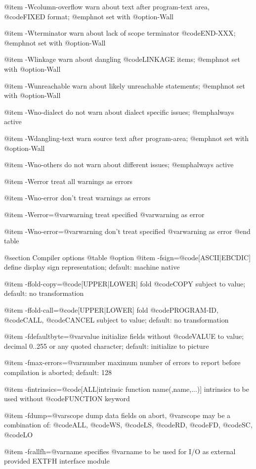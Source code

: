@item -Wcolumn-overflow
warn about text after program-text area, @code{FIXED} format; @emph{not} set with @option{-Wall}

@item -Wterminator
warn about lack of scope terminator @code{END-XXX}; @emph{not} set with @option{-Wall}

@item -Wlinkage
warn about dangling @code{LINKAGE} items; @emph{not} set with @option{-Wall}

@item -Wunreachable
warn about likely unreachable statements; @emph{not} set with @option{-Wall}

@item -Wno-dialect
do not warn about dialect specific issues; @emph{always} active

@item -Wdangling-text
warn source text after program-area; @emph{not} set with @option{-Wall}

@item -Wno-others
do not warn about different issues; @emph{always} active

@item -Werror
treat all warnings as errors

@item -Wno-error
don't treat warnings as errors

@item -Werror=@var{warning}
treat specified @var{warning} as error

@item -Wno-error=@var{warning}
don't treat specified @var{warning} as error
@end table

@section Compiler options
@table @option
@item -fsign=@code{[ASCII|EBCDIC]}
define display sign representation; default: machine native

@item -ffold-copy=@code{[UPPER|LOWER]}
fold @code{COPY} subject to value; default: no transformation

@item -ffold-call=@code{[UPPER|LOWER]}
fold @code{PROGRAM-ID}, @code{CALL}, @code{CANCEL} subject to value; default: no transformation

@item -fdefaultbyte=@var{value}
initialize fields without @code{VALUE} to value; decimal 0..255 or any quoted character; default: initialize to picture

@item -fmax-errors=@var{number}
maximum number of errors to report before
compilation is aborted; default: 128

@item -fintrinsics=@code{[ALL}|intrinsic function name(,name,...)]
intrinsics to be used without @code{FUNCTION} keyword

@item -fdump=@var{scope}
dump data fields on abort, @var{scope} may be
a combination of: @code{ALL}, @code{WS}, @code{LS}, @code{RD}, @code{FD}, @code{SC}, @code{LO}

@item -fcallfh=@var{name}
specifies @var{name} to be used for I/O
as external provided EXTFH interface module

